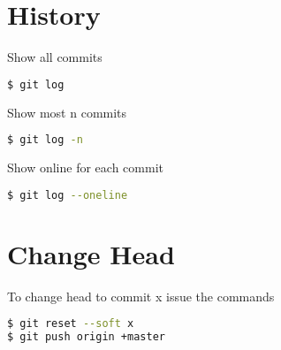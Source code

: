 \documentclass[a4paper,9pt]{extarticle}
\begin{document}
\begin{multicols*}{2}

\section{History}
Show all commits
\begin{lstlisting}[language=bash]
$ git log
\end{lstlisting}
Show most n commits
\begin{lstlisting}[language=bash]
$ git log -n
\end{lstlisting}
Show online for each commit
\begin{lstlisting}[language=bash]
$ git log --oneline 
\end{lstlisting}

\section{Change Head}
To change head to commit x issue the commands
\begin{lstlisting}[language=bash]
$ git reset --soft x
$ git push origin +master 
\end{lstlisting}


\end{multicols*}
\end{document}
